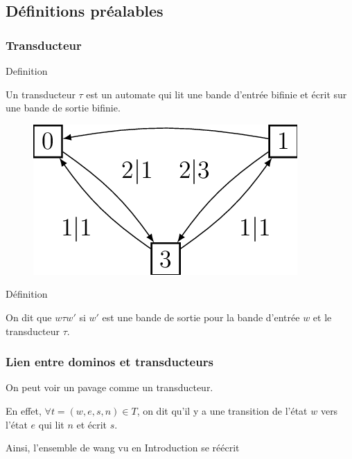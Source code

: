 \documentclass{beamer}
\begin{document}
\subsection{Définitions préalables}

\begin{frame}
\frametitle{Transducteur}

\begin{alertblock}{Definition}

Un transducteur $\tau$ est un automate qui lit une bande d'entrée bifinie et écrit sur une bande de sortie bifinie.
    
\end{alertblock}

\begin{figure}

    \includegraphics[scale = 1]{transducteur_exemple}
    \centering
    
\end{figure}

\begin{alertblock}{Définition}

On dit que $w \tau w'$ si $w'$ est une bande de sortie pour la bande d'entrée $w$ et le transducteur $\tau$.
    
\end{alertblock}

\end{frame}

\begin{frame}
\frametitle{Lien entre dominos et transducteurs}

On peut voir un pavage comme un transducteur.

En effet, $\forall t = (w,e,s,n) \in T$, on dit qu'il y a une transition de l'état $w$ vers l'état $e$ qui lit $n$ et écrit $s$.

Ainsi, l'ensemble de wang vu en Introduction se réécrit

\begin{center}


\end{center}

\end{frame}
\end{document}
